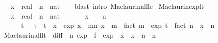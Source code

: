 \begin{isabellebody}
\ \ \ x\ {\isacharcolon}{\kern0pt}{\isacharcolon}{\kern0pt}\ real\ \ n\ {\isacharcolon}{\kern0pt}{\isacharcolon}{\kern0pt}\ nat\isanewline
%
\isadelimproof
\ \ %
\endisadelimproof
%
\isatagproof
{}\isamarkupfalse%
\ {\isacharparenleft}{\kern0pt}blast\ intro{\isacharcolon}{\kern0pt}\ Maclaurin{\isacharunderscore}{\kern0pt}all{\isacharunderscore}{\kern0pt}le{\isacharparenright}{\kern0pt}%
\endisatagproof
{\isafoldproof}%
%
\isadelimproof
%
\endisadelimproof
%
\isadelimdocument
%
\endisadelimdocument
%
\isatagdocument
%
\isamarkuptrue%
%
\endisatagdocument
{\isafolddocument}%
%
\isadelimdocument
%
\endisadelimdocument
{}\isamarkupfalse%
\ Maclaurin{\isacharunderscore}{\kern0pt}exp{\isacharunderscore}{\kern0pt}lt{\isacharcolon}{\kern0pt}\isanewline
\ \ \ x\ {\isacharcolon}{\kern0pt}{\isacharcolon}{\kern0pt}\ real\ \ n\ {\isacharcolon}{\kern0pt}{\isacharcolon}{\kern0pt}\ nat\isanewline
\ \ \isanewline
\ \ \ \ {\isachardoublequoteopen}x\ {\isasymnoteq}\ {}\ {\isasymLongrightarrow}\ n\ {\isachargreater}{\kern0pt}\ {}\ {\isasymLongrightarrow}\isanewline
\ \ \ \ \ \ {\isacharparenleft}{\kern0pt}{\isasymexists}t{\isachardot}{\kern0pt}\ {}\ {\isacharless}{\kern0pt}\ {\isasymbar}t{\isasymbar}\ {\isasymand}\ {\isasymbar}t{\isasymbar}\ {\isacharless}{\kern0pt}\ {\isasymbar}x{\isasymbar}\ {\isasymand}\ exp\ x\ {\isacharequal}{\kern0pt}\ {\isacharparenleft}{\kern0pt}{\isasymSum}m{\isacharless}{\kern0pt}n{\isachardot}{\kern0pt}\ {\isacharparenleft}{\kern0pt}x\ {\isacharcircum}{\kern0pt}\ m{\isacharparenright}{\kern0pt}\ {\isacharslash}{\kern0pt}\ fact\ m{\isacharparenright}{\kern0pt}\ {\isacharplus}{\kern0pt}\ {\isacharparenleft}{\kern0pt}exp\ t\ {\isacharslash}{\kern0pt}\ fact\ n{\isacharparenright}{\kern0pt}\ {\isacharasterisk}{\kern0pt}\ x\ {\isacharcircum}{\kern0pt}\ n{\isacharparenright}{\kern0pt}{\isachardoublequoteclose}\isanewline
%
\isadelimproof
\ %
\endisadelimproof
%
\isatagproof
{}\isamarkupfalse%
\ Maclaurin{\isacharunderscore}{\kern0pt}all{\isacharunderscore}{\kern0pt}lt\ {\isacharbrackleft}{\kern0pt}\ diff\ {\isacharequal}{\kern0pt}\ {\isachardoublequoteopen}{\isasymlambda}n{\isachardot}{\kern0pt}\ exp{\isachardoublequoteclose}\ \ f\ {\isacharequal}{\kern0pt}\ exp\ \ x\ {\isacharequal}{\kern0pt}\ x\ \ n\ {\isacharequal}{\kern0pt}\ n{\isacharbrackright}{\kern0pt}\ \isamarkupfalse%

\end{isabellebody}
